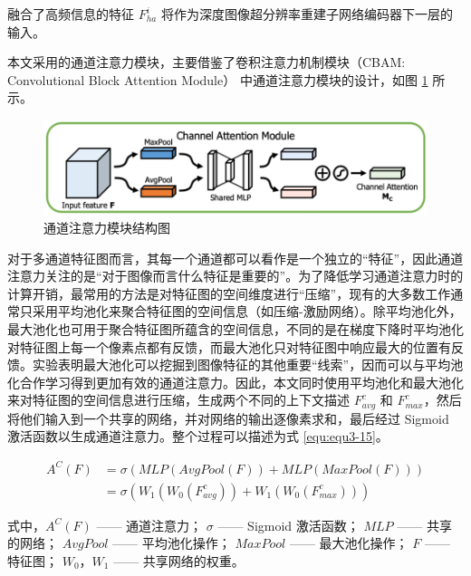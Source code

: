 融合了高频信息的特征 $F_{ha}^i$ 将作为深度图像超分辨率重建子网络编码器下一层的输入。

本文采用的通道注意力模块，主要借鉴了卷积注意力机制模块（CBAM: Convolutional Block Attention Module） \cite{DBLP:conf/eccv/WooPLK18} 中通道注意力模块的设计，如图 \ref{fig:fig3-6} 所示。

\begin{figure}[!htbp]
	\centering
	\includegraphics{figures/23.png}
	\caption{通道注意力模块结构图}
	\label{fig:fig3-6}
\end{figure}

对于多通道特征图而言，其每一个通道都可以看作是一个独立的“特征”，因此通道注意力关注的是“对于图像而言什么特征是重要的”。为了降低学习通道注意力时的计算开销，最常用的方法是对特征图的空间维度进行“压缩”，现有的大多数工作通常只采用平均池化来聚合特征图的空间信息（如压缩-激励网络）。除平均池化外，最大池化也可用于聚合特征图所蕴含的空间信息，不同的是在梯度下降时平均池化对特征图上每一个像素点都有反馈，而最大池化只对特征图中响应最大的位置有反馈。实验表明最大池化可以挖掘到图像特征的其他重要“线索”，因而可以与平均池化合作学习得到更加有效的通道注意力。因此，本文同时使用平均池化和最大池化来对特征图的空间信息进行压缩，生成两个不同的上下文描述 $F_{avg}^c$ 和 $F_{max}^c$，然后将他们输入到一个共享的网络，并对网络的输出逐像素求和，最后经过 Sigmoid 激活函数以生成通道注意力。整个过程可以描述为式 \ref{equ:equ3-15}。

\begin{equation}
\begin{aligned}
	A^C\left(F\right)&=\sigma\left(MLP\left(AvgPool\left(F\right)\right)+MLP\left(MaxPool\left(F\right)\right)\right)\\
	&=\sigma\left(W_1\left(W_0\left(F_{avg}^c\right)\right)+W_1\left(W_0\left(F_{max}^c\right)\right)\right)
\end{aligned}
\label{equ:equ3-15}
\end{equation}

\noindent 式中，$A^C\left(F\right)$ —— 通道注意力；\newline
\indent\quad $\sigma$ —— Sigmoid 激活函数；\newline
\indent\quad $MLP$ —— 共享的网络；\newline
\indent\quad $AvgPool$ —— 平均池化操作；\newline
\indent\quad $MaxPool$ —— 最大池化操作；\newline
\indent\quad $F$ —— 特征图；\newline
\indent\quad $W_0$，$W_1$ —— 共享网络的权重。

